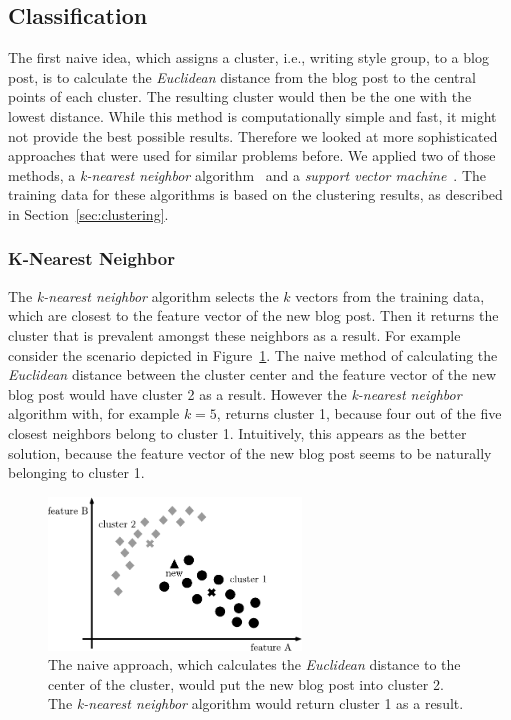 \subsection{Classification}
\label{sec:impl_classification}


The first naive idea, which assigns a cluster, i.e., writing style group, to a blog post, is to calculate the \textit{Euclidean} distance from the blog post to the central points of each cluster.
The resulting cluster would then be the one with the lowest distance.
While this method is computationally simple and fast, it might not provide the best possible results.
Therefore we looked at more sophisticated approaches that were used for similar problems before.
We applied two of those methods, a \textit{k-nearest neighbor} algorithm~\cite{peterson2009k} and a \textit{support vector machine}~\cite{kolari2006svms}.
The training data for these algorithms is based on the clustering results, as described in Section~\ref{sec:clustering}.


\subsubsection{K-Nearest Neighbor}
\label{sec:k_nearest_neighbor}


The \textit{k-nearest neighbor} algorithm selects the $k$ vectors from the training data, which are closest to the feature vector of the new blog post.
Then it returns the cluster that is prevalent amongst these neighbors as a result.
For example consider the scenario depicted in Figure~\ref{fig:naive}.
The naive method of calculating the \textit{Euclidean} distance between the cluster center and the feature vector of the new blog post would have cluster 2 as a result.
However the \textit{k-nearest neighbor} algorithm with, for example $k=5$, returns cluster 1, because four out of the five closest neighbors belong to cluster 1.
Intuitively, this appears as the better solution, because the feature vector of the new blog post seems to be naturally belonging to cluster 1.


\begin{figure}[ht!]
    \centering
    \includegraphics[width=0.6\textwidth]{images/naive.pdf}
    \caption{The naive approach, which calculates the \textit{Euclidean} distance to the center of the cluster, would put the new blog post into cluster 2. The \textit{k-nearest neighbor} algorithm would return cluster 1 as a result.}
    \label{fig:naive}
\end{figure}


